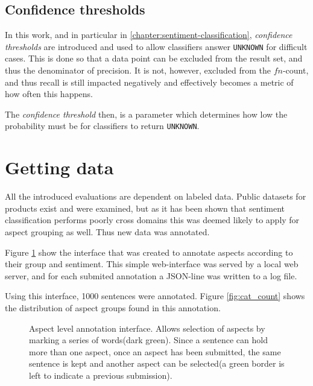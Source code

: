 \documentclass[a4paper,11pt]{kth-mag}
\begin{document}
\subsection{Confidence thresholds}
In this work, and in particular in \ref{chapter:sentiment-classification}, \emph{confidence thresholds} are
introduced and used to allow classifiers answer \texttt{UNKNOWN} for difficult cases.
This is done so that a data point can be excluded from the result set, and thus the denominator of precision.
It is not, however, excluded from the $fn$-count, and thus recall is still impacted negatively and effectively
becomes a metric of how often this happens.

The \emph{confidence threshold} then, is a parameter which determines how low the probability
must be for classifiers to return \texttt{UNKNOWN}.

\clearpage

\section{Getting data}
\label{subsec:getting_data}

All the introduced evaluations are dependent on labeled data. Public datasets for products exist and were examined,
but as it has been shown that sentiment classification performs poorly cross domains\cite{aue2005customizing}
this was deemed likely to apply for aspect grouping as well. Thus new data was annotated.

Figure \ref{fig:annotate_aspect} show the interface that was created to annotate aspects
according to their group and sentiment. This simple web-interface was served by a local web server,
and for each submited annotation a JSON-line was written to a log file.

Using this interface, 1000 sentences were annotated.
Figure \ref{fig:cat_count} shows the distribution of aspect groups found in this annotation.


\begin{figure}[h]
  \centering
  \caption{Aspect level annotation interface. Allows selection of aspects by marking a series of words(dark green). Since a sentence can hold more than one aspect, once an aspect has been submitted, the same sentence is kept and another aspect can be selected(a green border is left to indicate a previous submission).}
  \label{fig:annotate_aspect}
\end{figure}
\end{document}
